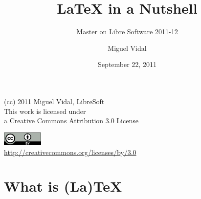 \documentclass{beamer}
\begin{document}
\title{\LaTeX{} in a Nutshell}
\subtitle{Master on Libre Software 2011-12}
\author{Miguel Vidal} 
\date{September 22, 2011}


\begin{frame}
  \vspace{2cm}
  \begin{center}
    {\small (cc) 2011 Miguel Vidal, LibreSoft} \\
    \medskip
    {\scriptsize This work is licensed under \\ a Creative Commons Attribution 3.0 License}
  \end{center}
  \begin{center}
    \href{http://creativecommons.org/licenses/by/3.0/es}{\includegraphics[width=2cm]{format/cc-by.png}} \\
    {\tiny \url{http://creativecommons.org/licenses/by/3.0}}
  \end{center}
\end{frame}%

\usebackgroundtemplate{}


\section{What is (La)\TeX}
\end{document}
